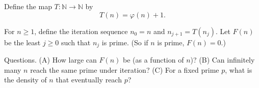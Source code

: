 Define the map $T:\mathbb N\to\mathbb N$ by
\[
T(n)=\varphi(n)+1.
\]

For $n\ge 1$, define the iteration sequence $n_0=n$ and $n_{j+1}=T(n_j)$.
Let $F(n)$ be the least $j\ge 0$ such that $n_j$ is prime.
(So if $n$ is prime, $F(n)=0$.)

Questions.
(A) How large can $F(n)$ be (as a function of $n$)?
(B) Can infinitely many $n$ reach the same prime under iteration?
(C) For a fixed prime $p$, what is the density of $n$ that eventually reach $p$?

